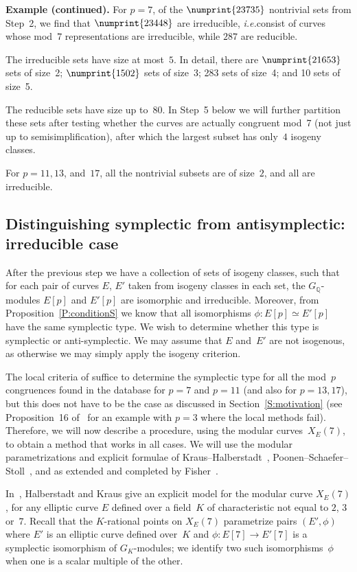 \documentclass[twoside,leqno,symbols-for-thanks, draft]{rmi}
\numberwithin{equation}{section}
\newcommand{\Q}{\mathbb{Q}}
\theoremstyle{remark}
\begin{document}
{\bf Example (continued).} For $p=7$, of the $\numprint{23735}$
nontrivial sets from Step~2, we find that $\numprint{23448}$ are
irreducible, {\it i.e.}\@ consist of curves whose mod~$7$
representations are irreducible, while $287$ are reducible.

The irreducible sets have size at most~$5$.  In detail, there are
$\numprint{21653}$ sets of size~2; $\numprint{1502}$ sets of size~3;
283 sets of size~4; and 10 sets of size~5.

The reducible sets have size up to~$80$.  In Step~5 below we will further
partition these sets after testing whether the curves are actually congruent
mod~7 (not just up to semisimplification), after which the largest subset has
only~$4$ isogeny classes.

For $p=11, 13$, and~$17$, all the nontrivial subsets are of size~$2$,
and all are irreducible.


\subsection{Distinguishing symplectic from antisymplectic: irreducible case}
After the previous step we have a collection of sets of isogeny
classes, such that for each pair of curves $E$, $E'$ taken from
isogeny classes in each set, the $G_{\Q}$-modules $E[p]$ and $E'[p]$
are isomorphic and irreducible. Moreover, from
Proposition~\ref{P:conditionS} we know that all isomorphisms $\phi : E[p]
\simeq E'[p]$ have the same symplectic type. We wish to determine
whether this type is symplectic or anti-symplectic.  We may assume
that $E$ and~$E'$ are not isogenous, as otherwise we may simply apply
the isogeny criterion.

The local criteria of \cite{FKSym} suffice to determine the symplectic
type for all the mod~$p$ congruences found in the database for $p=7$
and $p=11$ (and also for $p=13, 17$), but this does not have to be
the case as discussed in Section~\ref{S:motivation} (see
Proposition~16 of~\cite{FKSym} for an example with $p=3$ where the local
methods fail).  Therefore, we will now describe a procedure, using the
modular curves~$X_E(7)$, to obtain a method that works in all cases.
We will use the modular parametrizations and explicit formulae of
Kraus--Halberstadt~\cite{Halberstadt-Kraus-XE7},
Poonen--Schaefer--Stoll~\cite{PSS}, and as extended and completed by
Fisher~\cite{Fisher}.

In~\cite{Halberstadt-Kraus-XE7}, Halberstadt and Kraus give an
explicit model for the modular curve $X_E(7)$, for any elliptic curve
$E$ defined over a field~$K$ of characteristic not equal to $2$, $3$
or~$7$. Recall that the $K$-rational points on $X_E(7)$ parametrize
pairs $(E',\phi)$ where $E'$ is an elliptic curve defined over~$K$ and
$\phi:E[7]\to E'[7]$ is a symplectic isomorphism of $G_K$-modules; we
identify two such isomorphisms~$\phi$ when one is a scalar multiple of
the other.
\end{document}
